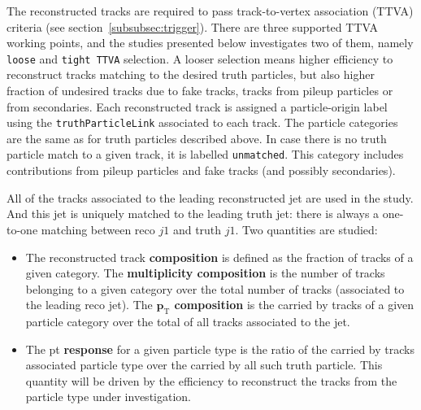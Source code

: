 The reconstructed tracks are required to pass track-to-vertex association (TTVA) criteria (see section~\ref{subsubsec:trigger}). 
There are three supported TTVA working points, and the studies presented below investigates two of them, namely \texttt{loose} and \texttt{tight TTVA} selection.
A looser selection means higher efficiency to reconstruct tracks matching to the desired truth particles, but also higher fraction of undesired tracks due to fake tracks, tracks from pileup particles or from secondaries.
Each reconstructed track is assigned a particle-origin label using the \texttt{truthParticleLink} associated to each track. 
The particle categories are the same as for truth particles described above.
In case there is no truth particle match to a given track, it is labelled \texttt{unmatched}. 
This category includes contributions from pileup particles and fake tracks (and possibly secondaries).


All of the tracks associated to the leading reconstructed jet are used in the study. And this jet is uniquely matched to the leading truth jet: there is always a one-to-one matching between reco $j1$ and truth $j1$.
Two quantities are studied: 
\begin{itemize}
\item
  The reconstructed track \textbf{composition} is defined as the fraction of tracks of a given category. The \textbf{multiplicity composition} is the number of tracks belonging to a given category over the total number of tracks (associated to the leading reco jet). The \textbf{$\boldsymbol{{p}_\mathrm{T}}$ composition} is the \pt{} carried by tracks of a given particle category over the total \pt{} of all tracks associated to the jet.
\item
  The pt{} \textbf{response} for a given particle type is the ratio of the \pt{} carried by tracks associated particle type over the \pt{} carried by all such truth particle. This quantity will be driven by the efficiency to reconstruct the tracks from the particle type under investigation.
\end{itemize}


